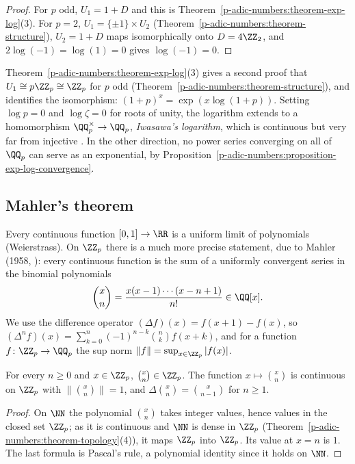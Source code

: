 \begin{proof}
For $p$ odd, $U_1 = 1 + D$ and this is Theorem~\ref{p-adic-numbers:theorem-exp-log}(3). For $p = 2$, $U_1 = \{\pm1\} \times U_2$ (Theorem~\ref{p-adic-numbers:theorem-structure}), $U_2 = 1 + D$ maps isomorphically
onto $D = 4\ZZ_2$, and $2\log(-1) = \log(1) = 0$ gives $\log(-1) = 0$.
\end{proof}

\begin{remark}\label{p-adic-numbers:remark-iwasawa-log}
Theorem~\ref{p-adic-numbers:theorem-exp-log}(3) gives a second proof that $U_1 \cong p\ZZ_p \cong \ZZ_p$ for $p$ odd (Theorem~\ref{p-adic-numbers:theorem-structure}), and identifies the isomorphism:
$(1 + p)^x = \exp(x\log(1 + p))$. Setting $\log p = 0$ and $\log\zeta = 0$ for roots of unity, the logarithm extends to a homomorphism $\QQ_p^\times \to \QQ_p$, \emph{Iwasawa's logarithm}, which is
continuous but very far from injective \cite{robert-padic}. In the other direction, no power series converging on all of $\QQ_p$ can serve as an exponential, by
Proposition~\ref{p-adic-numbers:proposition-exp-log-convergence}.
\end{remark}

\subsection{Mahler's theorem}\label{p-adic-numbers:subsection-mahler}

Every continuous function $[0, 1] \to \RR$ is a uniform limit of polynomials (Weierstrass). On $\ZZ_p$ there is a much more precise statement, due to Mahler (1958, \cite{mahler-1958}): every continuous
function is the sum of a uniformly convergent series in the binomial polynomials
\[
\binom xn = \frac{x(x - 1)\cdots(x - n + 1)}{n!} \in \QQ[x] .
\]
We use the difference operator $(\Delta f)(x) = f(x + 1) - f(x)$, so $(\Delta^nf)(x) = \sum_{k=0}^n(-1)^{n-k}\binom nkf(x + k)$, and for a function $f \colon \ZZ_p \to \QQ_p$ the sup norm
$\|f\| = \sup_{x \in \ZZ_p}|f(x)|$.

\begin{lemma}\label{p-adic-numbers:lemma-binomial-integral}
For every $n \geq 0$ and $x \in \ZZ_p$, $\binom xn \in \ZZ_p$. The function $x \mapsto \binom xn$ is continuous on $\ZZ_p$ with $\|\binom xn\| = 1$, and $\Delta\binom xn = \binom{x}{n - 1}$ for $n \geq 1$.
\end{lemma}

\begin{proof}
On $\NN$ the polynomial $\binom xn$ takes integer values, hence values in the closed set $\ZZ_p$; as it is continuous and $\NN$ is dense in $\ZZ_p$ (Theorem~\ref{p-adic-numbers:theorem-topology}(4)), it maps
$\ZZ_p$ into $\ZZ_p$. Its value at $x = n$ is $1$. The last formula is Pascal's rule, a polynomial identity since it holds on $\NN$.
\end{proof}

